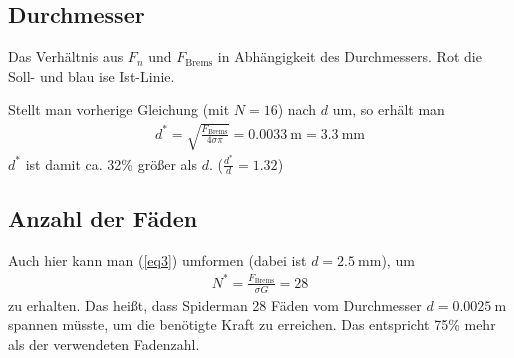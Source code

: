\documentclass[a4paper, 11pt, nofonts, 
twoside, sfsidenotes, nobib, justified]{tufte-handout}
\begin{document}
\subsection{Durchmesser}
\begin{marginfigure}
	\centering
	\caption{Das Verhältnis aus $F_n$ und $F_\text{Brems}$ in Abhängigkeit des Durchmessers. Rot die Soll- und blau ise Ist-Linie.}
	\label{fig4}
\end{marginfigure}
Stellt man vorherige Gleichung (mit $N=16$) nach $d$ um, so erhält man 
\begin{align*}
	d^* = \sqrt{\frac{F_\text{Brems}}{4\sigma\pi}} = \SI{0.0033}{\meter}=\SI{3.3}{\milli\meter}
\end{align*}
$d^*$ ist damit ca. 32\% größer als $d$. ($\frac{d^*}{d}=1.32$)
\subsection{Anzahl der Fäden}
Auch hier kann man (\ref{eq3}) umformen (dabei ist $d=\SI{2.5}{\milli\meter}$), um 
\begin{align*}
	N^*=\frac{F_\text{Brems}}{\sigma G} = 28
\end{align*}
zu erhalten. Das heißt, dass Spiderman 28 Fäden vom Durchmesser $d=\SI{0.0025}{\meter}$ spannen müsste, um die benötigte Kraft zu erreichen. Das entspricht 75\% mehr als der verwendeten Fadenzahl.
\end{document}
